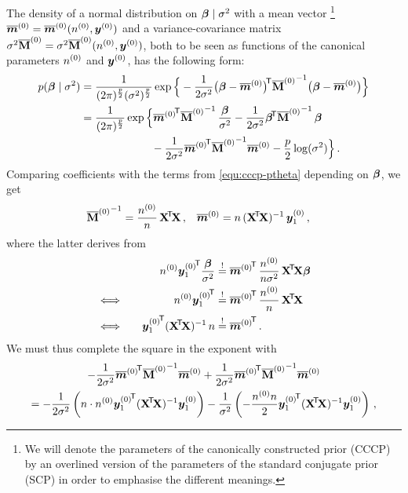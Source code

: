 The density of a normal distribution on $\boldsymbol{\beta}\mid\sigma^2$ with a mean vector%
\footnote{We will denote the parameters of the canonically constructed prior (CCCP)
by an overlined version of the parameters of the standard conjugate prior (SCP)
in order to emphasise the different meanings.}
$\overline{{\bm m}}^{(0)} = \overline{{\bm m}}^{(0)}(n^{(0)},{\bm y}^{(0)})$ and a variance-covariance matrix $\sigma^2 \overline{\mathbf{M}}^{(0)} = \sigma^2 \overline{\mathbf{M}}^{(0)}(n^{(0)},{\bm y}^{(0)})$,
both to be seen as functions of the canonical parameters $n^{(0)}$ and ${\bm y}^{(0)}$,
has the following form:
\begin{align*}
p(\bbeta\mid\sigma^2) &= \frac{1}{(2\pi)^{\frac{p}{2}} (\sigma^2)^{\frac{p}{2}}}
                         \exp \Big\{ -\frac{1}{2 \sigma^2} \big(\bbeta - \tmz\big)^\tra {\tMz}^{-1}
                                                           \big(\bbeta - \tmz\big) \Big\}\\
                      &= \frac{1}{(2\pi)^{\frac{p}{2}}}
                         \exp\Big\{ {\tmz}^\tra {\tMz}^{-1} \,\frac{\bbeta}{\sigma^2}
                                   -\frac{1}{2\sigma^2} \bbeta^\tra {\tMz}^{-1}\, \bbeta \\ & \hspace*{15ex}
                                   -\frac{1}{2\sigma^2} {\tmz}^\tra {\tMz}^{-1} \tmz
                                   -\frac{p}{2} \log(\sigma^2)\Big\}\,.
\end{align*}
Comparing coefficients with the terms from \eqref{equ:cccp-ptheta} depending on $\boldsymbol{\beta}$, we get
\begin{align*}
{\tMz}^{-1} &= %
               \frac{\nz}{n}\, \XtX\,, &
       \tmz &= %
               n\, (\XtX)^{-1}\, \byz_1\,,
\end{align*}
where the latter derives from
\begin{alignat*}{2}
& &
\nz {\byz_1}^\tra \frac{\bbeta}{\sigma^2} &\stackrel{!}{=} {\tmz}^\tra\, \frac{\nz}{n\sigma^2}\, \XtX \bbeta \\
&\Longleftrightarrow\quad &
\nz {\byz_1}^\tra                         &\stackrel{!}{=} {\tmz}^\tra\, \frac{\nz}{n}\, \XtX \\
&\Longleftrightarrow\quad &
{\byz_1}^\tra (\XtX)^{-1}\, n             &\stackrel{!}{=} {\tmz}^\tra\,.
\end{alignat*}
We must thus complete the square in the exponent with
\begin{multline*}
    -\frac{1}{2\sigma^2} {\tmz}^\tra {\tMz}^{-1} \tmz
    +\frac{1}{2\sigma^2} {\tmz}^\tra {\tMz}^{-1} \tmz \\
  = -\frac{1}{2\sigma^2}\left( n \cdot \nz {\byz_1}^\tra (\XtX)^{-1} \byz_1 \right)
    -\frac{1}{\sigma^2} \left(-\frac{\nz n}{2} {\byz_1}^\tra (\XtX)^{-1} \byz_1 \right)\,,
\end{multline*}
